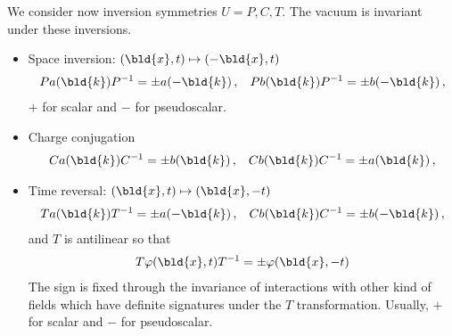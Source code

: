 We consider now inversion symmetries $U = P, C, T$. 
The vacuum is invariant under these inversions.
\begin{itemize}
\item
Space inversion:
$(\bld{x}, t) \mapsto (-\bld{x}, t)$ 
\begin{eqnarray}
P a(\bld{k}) P^{-1} = \pm a(-\bld{k})\,,
\hspace{3mm}
P b(\bld{k}) P^{-1} = \pm b(-\bld{k})\,,
\end{eqnarray}
$+$ for scalar and $-$ for pseudoscalar.
\item
Charge conjugation
\begin{eqnarray}
C a(\bld{k}) C^{-1} = \pm b(\bld{k})\,,
\hspace{3mm}
C b(\bld{k}) C^{-1} = \pm a(\bld{k})\,,
\end{eqnarray}
\item
Time reversal: $(\bld{x}, t) \mapsto (\bld{x}, -t)$ 
\begin{eqnarray}
T a(\bld{k}) T^{-1} = \pm a(-\bld{k})\,,
\hspace{3mm}
C b(\bld{k}) C^{-1} = \pm b(-\bld{k})\,,
\end{eqnarray}
and $T$ is antilinear so that
\begin{eqnarray}
T \varphi(\bld{x}, t) T^{-1} = \pm \varphi(\bld{x}, -t)
\end{eqnarray}
The sign is fixed through the invariance of interactions 
with other kind of fields which have definite signatures
under the $T$ transformation. Usually, $+$ for scalar and
$-$ for pseudoscalar.
\end{itemize}

\bigskip

